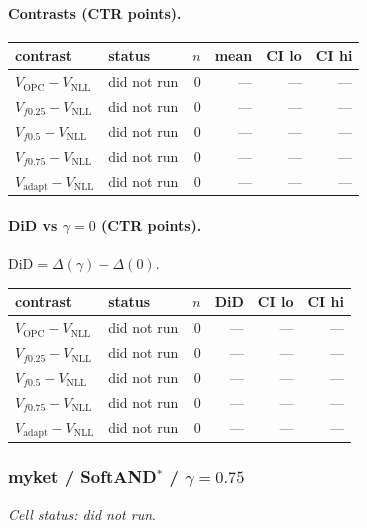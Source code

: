 \documentclass[10pt,a4paper]{article}
\begin{document}
\paragraph{Contrasts (CTR points).}
{\centering\small\begin{tabular}{llrrrr}
\toprule contrast & status & $n$ & mean & CI lo & CI hi \\
\midrule
$V_{\mathrm{OPC}}-V_{\mathrm{NLL}}$ & did not run & 0 & --- & --- & --- \\
$V_{f0.25}-V_{\mathrm{NLL}}$ & did not run & 0 & --- & --- & --- \\
$V_{f0.5}-V_{\mathrm{NLL}}$ & did not run & 0 & --- & --- & --- \\
$V_{f0.75}-V_{\mathrm{NLL}}$ & did not run & 0 & --- & --- & --- \\
$V_{\mathrm{adapt}}-V_{\mathrm{NLL}}$ & did not run & 0 & --- & --- & --- \\
\bottomrule\end{tabular}\par}
\paragraph{DiD vs $\gamma=0$ (CTR points).} $\mathrm{DiD}=\Delta(\gamma)-\Delta(0)$.
{\centering\small\begin{tabular}{llrrrr}
\toprule contrast & status & $n$ & DiD & CI lo & CI hi \\
\midrule
$V_{\mathrm{OPC}}-V_{\mathrm{NLL}}$ & did not run & 0 & --- & --- & --- \\
$V_{f0.25}-V_{\mathrm{NLL}}$ & did not run & 0 & --- & --- & --- \\
$V_{f0.5}-V_{\mathrm{NLL}}$ & did not run & 0 & --- & --- & --- \\
$V_{f0.75}-V_{\mathrm{NLL}}$ & did not run & 0 & --- & --- & --- \\
$V_{\mathrm{adapt}}-V_{\mathrm{NLL}}$ & did not run & 0 & --- & --- & --- \\
\bottomrule\end{tabular}\par}
\bigskip
\subsubsection{myket / SoftAND$^*$ / $\gamma=0.75$}
\emph{Cell status: did not run}.
\end{document}
